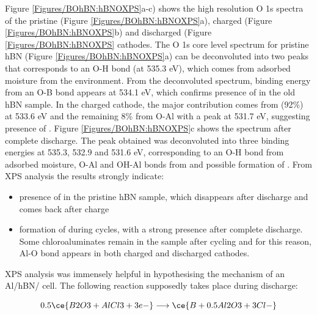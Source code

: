 Figure \ref{Figures/BOhBN:hBNOXPS}a-c) shows the high resolution O 1s spectra of the pristine (Figure \ref{Figures/BOhBN:hBNOXPS}a), charged (Figure \ref{Figures/BOhBN:hBNOXPS}b) and discharged (Figure \ref{Figures/BOhBN:hBNOXPS} cathodes. The O 1s core level spectrum for pristine hBN (Figure \ref{Figures/BOhBN:hBNOXPS}a) can be deconvoluted into two peaks that corresponds to an O-H bond (at 535.3 eV), which comes from adsorbed moisture from the environment. From the deconvoluted spectrum, binding energy from an O-B bond appears at 534.1 eV, which confirms presence of  in the old hBN sample. In the charged cathode, the major contribution comes from  (92\%) at 533.6 eV and the remaining 8\% from O-Al with a peak at 531.7 eV, suggesting presence of .  Figure \ref{Figures/BOhBN:hBNOXPS}c shows the spectrum after complete discharge. The peak obtained was deconvoluted into three binding energies at 535.3, 532.9 and 531.6 eV, corresponding to an O-H bond from adsorbed moisture, O-Al and OH-Al bonds from  and possible formation of  \cite{}. From XPS analysis the results strongly indicate:

\begin{itemize}
\item presence of  in the pristine hBN sample, which disappears after discharge and comes back after charge
\item formation of  during cycles, with a strong presence after complete discharge. Some chloroaluminates remain in the sample after cycling and for this reason, Al-O bond appears in both charged and discharged cathodes.
\end{itemize} 

XPS analysis was immensely helpful in hypothesising the mechanism of an Al/hBN/ cell. The following reaction supposedly takes place during discharge:

\begin{equation}
    0.5\ce{B2O3 + AlCl3 + 3e-} \longrightarrow \ce{B + 0.5Al2O3 + 3Cl-}
\end{equation}

